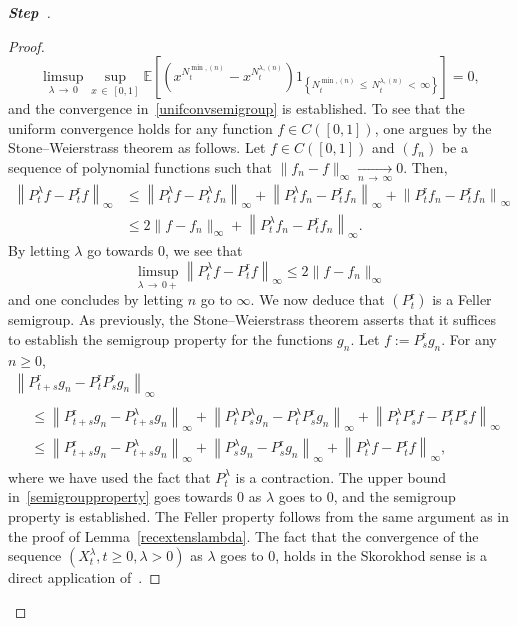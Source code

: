 \documentclass[AHL,Unicode,longabstracts,published]{cedram}
\newcommand{\rmr}{\mathrm{r}}
\newcommand{\bbE}{\mathbb{E}}
\newcounter{stepcount}
\newenvironment{step}{\refstepcounter{stepcount}\begin{proof}[\textbf{Step~\thestepcount}]}{\end{proof}}
\begin{document}
\begin{step}
\begin{proof}
\[
\underset{\lambda\,\rightarrow\,0}{\limsup} \underset{x\,\in\,[0,1]}{\sup}\bbE\left[\left(x^{N^{\min,(n)}_{t}}-x^{N_t^{\lambda,(n)}}\right)1_{\left\{N_t^{\min,(n)}\,\leq\,N_t^{\lambda,(n)}\,<\,\infty\right\}}\right]=0,
\]
and the convergence in~\eqref{unifconvsemigroup} is established. To see that the uniform convergence holds for any function $f\in C([0,1])$, one argues by the Stone--Weierstrass theorem as follows. Let $f\in C([0,1])$ and $(f_n)$ be a sequence of polynomial functions such that $\|f_n-f\|_\infty\underset{n\,\rightarrow\,\infty}{\longrightarrow} 0$. Then,
\begin{align*}
\left\|P_t^{\lambda}f-P_t^{\rmr}f\right\|_\infty &\leq \left\|P_t^{\lambda}f-P_t^{\lambda}f_n\right\|_\infty+\left\|P_t^{\lambda}f_n-P_t^{\rmr}f_n\right\|_\infty+\left\|P_t^{\rmr}f_n-P_t^{\rmr}f_n\right\|_\infty\\
&\leq 2\|f-f_n\|_\infty+\left\|P_t^{\lambda}f_n-P_t^{\rmr}f_n\right\|_\infty.
\end{align*}
By letting $\lambda$ go towards $0$, we see that
\[
\underset{\lambda\,\rightarrow\,0+}{\limsup} \left\|P_t^{\lambda}f-P_t^{\rmr}f\right\|_\infty\leq 2\|f-f_n\|_\infty
\]
and one concludes by letting $n$ go to $\infty$. We now deduce that $(P_t^{\rmr})$ is a Feller semigroup. As previously, the Stone--Weierstrass theorem asserts that it suffices to establish the semigroup property for the functions $g_n$. Let $f:=P_s^{\rmr}g_n$. For any $n\geq 0$,
\begin{multline}\label{semigroupproperty}
\left\|P_{t+s}^{\rmr}g_n-P_{t}^{\rmr}P_{s}^{\rmr}g_n\right\|_\infty \\
\begin{aligned}
&\leq \left\|P_{t+s}^{\rmr}g_n-P_{t+s}^{\lambda}g_n\right\|_\infty +\left\|P_{t}^{\lambda}P_{s}^{\lambda}g_n-P_{t}^{\lambda}P_{s}^{\rmr}g_n\right\|_\infty+\left\|P_{t}^{\lambda}P_s^{\rmr}f-P_{t}^{\rmr}P_s^{\rmr}f\right\|_\infty \\
&\leq \left\|P_{t+s}^{\rmr}g_n-P_{t+s}^{\lambda}g_n\right\|_\infty+\left\|P_{s}^{\lambda}g_n-P_{s}^{\rmr}g_n\right\|_\infty+\left\|P_{t}^{\lambda}f-P_{t}^{\rmr}f\right\|_\infty,
\end{aligned}
\end{multline}
where we have used the fact that $P_t^{\lambda} $ is a contraction. The upper bound in~\eqref{semigroupproperty} goes towards $0$ as $\lambda$ goes to $0$, and the semigroup property is established. The Feller property follows from the same argument as in the proof of Lemma~\ref{recextenslambda}. The fact that the convergence of the sequence $(X_t^{\lambda},t\geq 0,\lambda>0)$ as $\lambda$ goes to $0$, holds in the Skorokhod sense is a direct application of~\cite[Theorem~2.5 page~167]{EthierKurtz}.


\end{proof}
\end{step}
\end{document}
